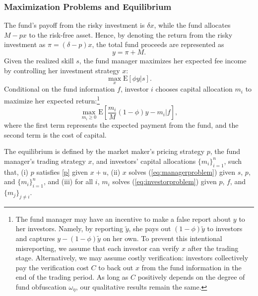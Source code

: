 \subsubsection{Maximization Problems and Equilibrium}
The fund's payoff from the risky investment is $\delta x$, while the fund allocates $M-px$ to the risk-free asset. Hence, by denoting the return from the risky investment as $\pi=(\delta -p) x$, the total fund proceeds are represented as
\begin{equation}
    y=\pi+M.
\end{equation}
Given the realized skill $s$, the fund manager maximizes her expected fee income by controlling her investment strategy $x$:
\begin{equation}
    \max_{x} \mathrm{E}\left[\phi y |s\right].\label{eq:managerproblem}
\end{equation}
Conditional on the fund information $f$, investor $i$ chooses capital allocation $m_i$ to maximize her expected return:\footnote{The fund manager may have an incentive to make a false report about $y$ to her investors. Namely, by reporting $\tilde{y}$, she pays out $(1-\phi)\tilde{y}$ to investors and captures $y-(1-\phi)\tilde{y}$ on her own. To prevent this intentional misreporting, we assume that each investor can verify $x$ after the trading stage. Alternatively, we may assume costly verification: investors collectively pay the verification cost $C$ to back out $x$ from the fund information in the end of the trading period. As long as $C$ positively depends on the degree of fund obfuscation $\omega_{\eta}$, our qualitative results remain the same.}
\begin{equation}
    \max_{m_i\ge 0}\mathrm{E}\left[\frac{m_i}{M}(1-\phi)y -m_{i}|f\right],\label{eq:investorproblem}
\end{equation}
where the first term represents the expected payment from the fund, and the second term is the cost of capital.

\begin{definition}\label{def:eqm}
    The equilibrium is defined by the market maker's pricing strategy $p$, the fund manager's trading strategy $x$, and investors' capital allocations $\{m_{i}\}_{i=1}^{n}$, such that, (i) $p$ satisfies \eqref{p} given $x+u$, (ii) $x$ solves (\ref{eq:managerproblem}) given $s$, $p$, and $\{m_{i}\}_{i=1}^{n}$, and (iii) for all $i$, $m_i$ solves (\ref{eq:investorproblem}) given $p$, $f$, and $\{m_j\}_{j\neq i}$.

\end{definition} 
